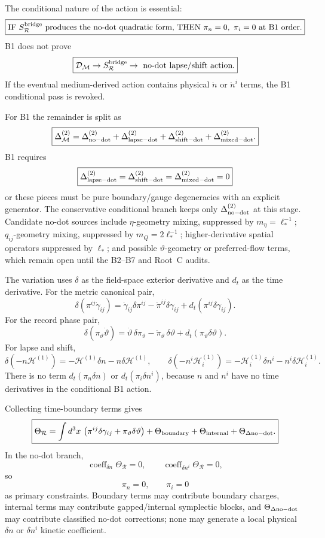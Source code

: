 \documentclass[11pt]{article}
\begin{document}
The conditional nature of the action is essential:
\[
\boxed{
\text{IF }S_{\mathcal R}^{\rm bridge}\text{ produces the no-dot quadratic
form, THEN }\pi_n=0,\ \pi_i=0\text{ at B1 order.}
}
\]
B1 does not prove
\[
\boxed{\mathcal D_{\mathcal M}\to S_{\mathcal R}^{\rm bridge}
\to\text{ no-dot lapse/shift action}.}
\]
If the eventual medium-derived action contains physical \(\dot n\) or
\(\dot n^i\) terms, the B1 conditional pass is revoked.

For B1 the remainder is split as
\[
\boxed{
\Delta_{\mathcal M}^{(2)}
=\Delta_{\rm no-dot}^{(2)}
+\Delta_{\rm lapse-dot}^{(2)}
+\Delta_{\rm shift-dot}^{(2)}
+\Delta_{\rm mixed-dot}^{(2)}.
}
\]
B1 requires
\[
\boxed{
\Delta_{\rm lapse-dot}^{(2)}=
\Delta_{\rm shift-dot}^{(2)}=
\Delta_{\rm mixed-dot}^{(2)}=0
}
\]
or these pieces must be pure boundary/gauge degeneracies with an explicit
generator.  The conservative conditional branch keeps only
\(\Delta_{\rm no-dot}^{(2)}\) at this stage.  Candidate no-dot sources include
\(\eta\)-geometry mixing, suppressed by \(m_\eta=\ell_*^{-1}\);
\(q_{ij}\)-geometry mixing, suppressed by \(m_Q=2\ell_*^{-1}\);
higher-derivative spatial operators suppressed by \(\ell_*\); and possible
\(\vartheta\)-geometry or preferred-flow terms, which remain open until the
B2--B7 and Root~C audits.

The variation uses \(\delta\) as the field-space exterior derivative and
\(d_t\) as the time derivative.  For the metric canonical pair,
\[
\boxed{
\delta(\pi^{ij}\dot\gamma_{ij})
=\dot\gamma_{ij}\delta\pi^{ij}
-\dot\pi^{ij}\delta\gamma_{ij}
+d_t(\pi^{ij}\delta\gamma_{ij}).
}
\]
For the record phase pair,
\[
\boxed{
\delta(\pi_\vartheta\dot\vartheta)
=\dot\vartheta\,\delta\pi_\vartheta
-\dot\pi_\vartheta\,\delta\vartheta
+d_t(\pi_\vartheta\delta\vartheta).
}
\]
For lapse and shift,
\[
\boxed{
\delta(-n\mathcal H^{(1)})
=-\mathcal H^{(1)}\delta n-n\delta\mathcal H^{(1)},\qquad
\delta(-n^i\mathcal H_i^{(1)})
=-\mathcal H_i^{(1)}\delta n^i-n^i\delta\mathcal H_i^{(1)}.
}
\]
There is no term \(d_t(\pi_n\delta n)\) or
\(d_t(\pi_i\delta n^i)\), because \(n\) and \(n^i\) have no time derivatives
in the conditional B1 action.

Collecting time-boundary terms gives
\[
\boxed{
\Theta_{\mathcal R}
=\int d^3x\,
\left(
\pi^{ij}\delta\gamma_{ij}
+\pi_\vartheta\delta\vartheta
\right)
+\Theta_{\rm boundary}
+\Theta_{\rm internal}
+\Theta_{\Delta{\rm no-dot}}.
}
\]
In the no-dot branch,
\[
\boxed{
\operatorname{coeff}_{\delta n}\Theta_{\mathcal R}=0,\qquad
\operatorname{coeff}_{\delta n^i}\Theta_{\mathcal R}=0,
}
\]
so
\[
\boxed{\pi_n=0,\qquad \pi_i=0}
\]
as primary constraints.  Boundary terms may contribute boundary charges,
internal terms may contribute gapped/internal symplectic blocks, and
\(\Theta_{\Delta{\rm no-dot}}\) may contribute classified no-dot corrections;
none may generate a local physical \(\delta n\) or \(\delta n^i\) kinetic
coefficient.
\end{document}
